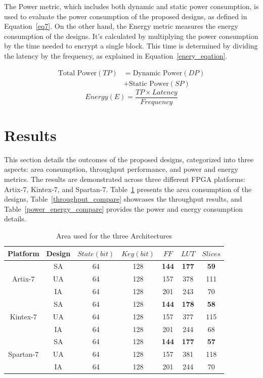 \documentclass[final,5p,times,twocolumn]{elsarticle}
\begin{document}
The Power metric, which includes both dynamic and static power consumption, is used to evaluate the power consumption of the proposed designs, as defined in Equation~\ref{eq7}.
On the other hand, the Energy metric measures the energy consumption of the designs. It's calculated by multiplying the power consumption by the time needed to encrypt a single block. This time is determined by dividing the latency by the frequency, as explained in Equation~\ref{enery_eqation}.

\begin{align}
    \text{Total Power} (TP) & = \text{Dynamic Power} (DP) \nonumber \\
                            & + \text{Static Power} (SP)
    \label{eq7}
\end{align}
\begin{equation}
    Energy(E) = \frac{TP \times Latency }{Frequency}
    \label{enery_eqation}
\end{equation}


\section{Results}\label{sec5}

This section details the outcomes of the proposed designs, categorized into three aspects: area consumption, throughput performance, and power and energy metrics.
The results are demonstrated across three different FPGA platforms: Artix-7, Kintex-7, and Spartan-7.
Table~\ref{area_compare} presents the area consumption of the designs, Table~\ref{throughput_compare} showcases the throughput results, and Table~\ref{power_energy_compare} provides the power and energy consumption details.


\begin{table}[h]
    \caption{Area used for the three Architectures}\label{area_compare}%
    \begin{tabular*}{\textwidth}{@{\extracolsep\fill}|c|c|c|c|c|c|c|}
        \hline
        Platform & Design & $State(bit)$ & $Key(bit)$ & $FF$ & $LUT$ & $Slices$ \\
        \hline
        \multirow{3}{*}{Artix-7}  & SA & 64 & 128 & \textbf{144} & \textbf{177} & \textbf{59} \\
        & UA & 64 & 128 & 157 & 378 & 111 \\
        & IA & 64 & 128 & 201 & 243 & 70 \\
        \hline
        \multirow{3}{*}{Kintex-7} & SA & 64 & 128 & \textbf{144} & \textbf{178} & \textbf{58}\\
        & UA & 64 & 128 & 157 & 377 & 115 \\
        & IA & 64 & 128 & 201 & 244 & 68 \\
        \hline
        \multirow{3}{*}{Spartan-7} & SA & 64 & 128 & \textbf{144} & \textbf{177} & \textbf{57}\\
        & UA & 64 & 128 & 157 & 381 & 118 \\
        & IA & 64 & 128 & 201 & 244 & 70 \\
        \hline
    \end{tabular*}
\end{table}
\end{document}
